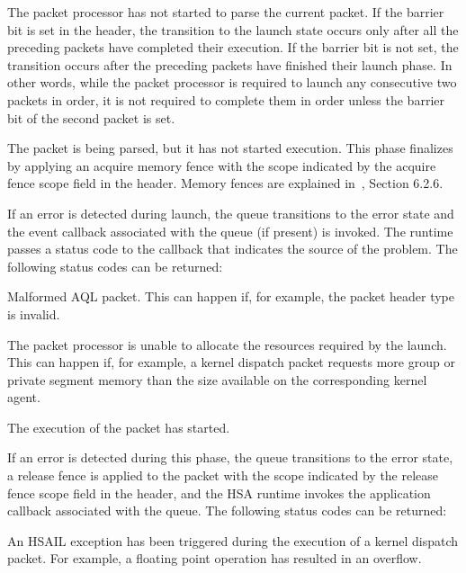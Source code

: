 \documentclass[oneside]{book}
\begin{document}
\begin{description}[itemsep=2pt,leftmargin=0cm, labelindent=0cm] \item[In queue]
  The packet processor has not started to parse the current packet. If the
  barrier bit is set in the header, the transition to the launch state occurs
  only after all the preceding packets have completed their execution. If the
  barrier bit is not set, the transition occurs after the preceding packets have
  finished their launch phase.  In other words, while the packet processor is
  required to launch any consecutive two packets in order, it is not required to
  complete them in order unless the barrier bit of the second packet is set.

\item[Launch] The packet is being parsed, but it has not started execution. This
  phase finalizes by applying an acquire memory fence with the scope indicated
  by the acquire fence scope field in the header. Memory fences are explained
  in~\cite{prm}, Section 6.2.6.

  If an error is detected during launch, the queue transitions to the error
  state and the event callback associated with the queue (if present) is
  invoked. The runtime passes a status code to the callback that indicates the
  source of the problem.  The following status codes can be returned:
  \begin{description}[itemsep=1.5pt,labelindent=.5cm]
  \item[\hsaref{HSA_STATUS_ERROR_INVALID_PACKET_FORMAT}] Malformed AQL
    packet. This can happen if, for example, the packet header type is invalid.
  \item[\hsaref{HSA_STATUS_ERROR_OUT_OF_RESOURCES}] The packet processor is
    unable to allocate the resources required by the launch. This can happen if,
    for example, a kernel dispatch packet requests more group or private segment
    memory than the size available on the corresponding kernel agent.
  \end{description}
\item[Active] The execution of the packet has started.

  If an error is detected during this phase, the queue transitions to the error
  state, a release fence is applied to the packet with the scope indicated by
  the release fence scope field in the header, and the HSA runtime invokes the
  application callback associated with the queue. The following status codes can
  be returned:
  \begin{description}[itemsep=1.5pt,labelindent=.5cm]
  \item[\hsaref{HSA_STATUS_ERROR_EXCEPTION}] An HSAIL exception has been
    triggered during the execution of a kernel dispatch packet. For example, a
    floating point operation has resulted in an overflow.
  \end{description}


\end{description}
\end{document}
